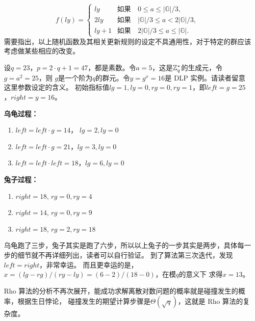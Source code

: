 \[ f(ly) = \left \{
\begin{array}{ll}
ly & \text{如果} \quad 0 \le a \leq \vert \mathbb{G} \vert /3, \\
2 ly & \text{如果} \quad \vert \mathbb{G} \vert /3 \leq a < 2\vert \mathbb{G} \vert /3,\\
ly + 1 & \text{如果} \quad  2\vert \mathbb{G} \vert /3 \le a \le \vert \mathbb{G} \vert .
\end{array}
\right.
\]
需要指出，以上随机函数及其相关更新规则的设定不具通用性，对于特定的群应该考虑做某些相应的改变。
\begin{example}
设$q = 23$，$p = 2 \cdot q + 1 = 47$，都是素数。令$a = 5$，这是${\mathbb Z}_q^*$的生成元，令$g = a^2 = 25$，则
$g$是一个阶为$q$的群元。令$y = g^x  = 16$是 DLP 实例。请读者留意这里参数设定的含义。
初始指标值$lg = 1, ly = 0, rg = 0, ry = 1$，即$left = g = 25$，$right = y = 16$。

\noindent \textbf{乌龟过程：}
\begin{enumerate}
\item $left  = left \cdot g  = 14$， $lg = 2, ly = 0$

\item $left  = left \cdot g  = 21$，$lg = 3, ly =0$

\item $left  = left \cdot left = 18$，$lg = 6, ly =0$
\end{enumerate}

\noindent \textbf{兔子过程：}
\begin{enumerate}
\item $right = 18$, $rg = 0, ry = 4$

\item $right = 14$, $rg = 0, ry = 9$

\item $right = 18$, $rg = 2, ry =18$
\end{enumerate}

乌龟跑了三步，兔子其实是跑了六步，所以以上兔子的一步其实是两步，具体每一步的细节就不再详细列出，读者可以自行验证。
到了算法第三次迭代，发现$left = right$，非常幸运。
而且更幸运的是，$x = (lg - rg)/(ry - ly) = (6 - 2)/(18 - 0) $，在模$q$的意义下
求得$x = 13$。
\end{example}

Rho 算法的分析不再次展开，能成功求解离散对数问题的概率就是碰撞发生的概率，根据生日悖论，
碰撞发生的期望计算步骤是$\Theta(\sqrt{q})$，这就是 Rho 算法的复杂度。

